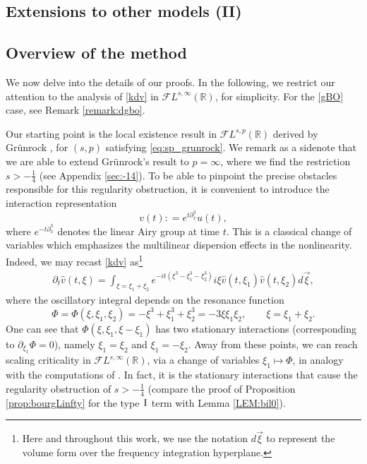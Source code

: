 \documentclass[a4paper,
11pt,  reqno]{amsart}
\newcommand{\I}{\hspace{0.2mm}\textup{I}\hspace{0.2mm}}
\newcommand{\5}{\textup{V}}
\newcommand{\FL}{\mathcal{F} L}
\newcommand{\dx}{\partial_x}
\newcommand{\dt}{\partial_t}
\theoremstyle{remark}
\newcommand{\R}{\mathbb{R}}
\numberwithin{equation}{section}
\numberwithin{theorem}{section}
\begin{document}
\subsection{Extensions to other models (II)}


\subsection{Overview of the method}
\label{SUBSEC:method}
We now delve into the details of our proofs.
In the following, we restrict our attention to the analysis of \eqref{kdv} in $\FL^{s,\infty}(\R)$, for simplicity. For the \eqref{gBO} case, see Remark \ref{remark:dgbo}.


	Our starting point is the local existence result in $\mathcal{F}L^{s,p}(\R)$ derived by Grünrock \cite{Grunrock_ldv_hier}, for $(s,p)$ satisfying \eqref{eq:sp_grunrock}. We remark as a sidenote that we are able to extend Grünrock's result to $p=\infty$, where we find the restriction $s>-\frac14$ (see Appendix \ref{sec:-14}).
	To be able to pinpoint the precise obstacles responsible for this regularity obstruction,  it is convenient to introduce the interaction representation \cite{Ginibre_interaction_rep}
	\begin{equation}\label{inter}
		v(t) : = e^{t\partial_x^3}u(t),
	\end{equation}
	where $e^{-t\dx^3}$ denotes the linear Airy group at time $t$.
This is a classical change of variables which emphasizes the multilinear dispersion effects in the nonlinearity.
Indeed, we may recast \eqref{kdv} as\footnote{Here and throughout this work, we use the notation $d\vec{\xi}$ to represent the volume form over the frequency integration hyperplane.}
	\begin{align}
		\label{dtv}
		\dt{\widehat{v}}(t,\xi) = \int_{\xi = \xi_1+\xi_2} e^{-it (\xi^3 -\xi_1^3 -
			\xi^3_2)} i \xi \widehat{v}(t,\xi_1) \widehat{v}(t,\xi_2)  d\vec{\xi}
		,
	\end{align}
where the oscillatory integral depends on the resonance function
	\begin{equation}\label{phase-intro}
		\Phi = \Phi(\xi,\xi_1,\xi_2)=-\xi^3+\xi_1^3+\xi_2^3 = -3\xi\xi_1\xi_2, \qquad \xi=\xi_1+\xi_2.
	\end{equation}
One can see that $\Phi(\xi, \xi_1, \xi-\xi_1)$ has two stationary interactions
(corresponding to $\partial_{\xi_1}\Phi=0$), namely $\xi_1=\xi_2$ and $\xi_1=-\xi_2$. Away from these points, we can reach scaling criticality in $\FL^{s,\infty}(\R)$, via a change of variables $\xi_1\mapsto \Phi$, in analogy with the computations of \cite{kpv_bilin}.
In fact, it is the stationary interactions that cause the regularity obstruction of $s>-\frac14$ (compare the proof of Proposition \ref{prop:bourgLinfty} for the type $\I$ term with Lemma \ref{LEM:bil0}).
\end{document}

